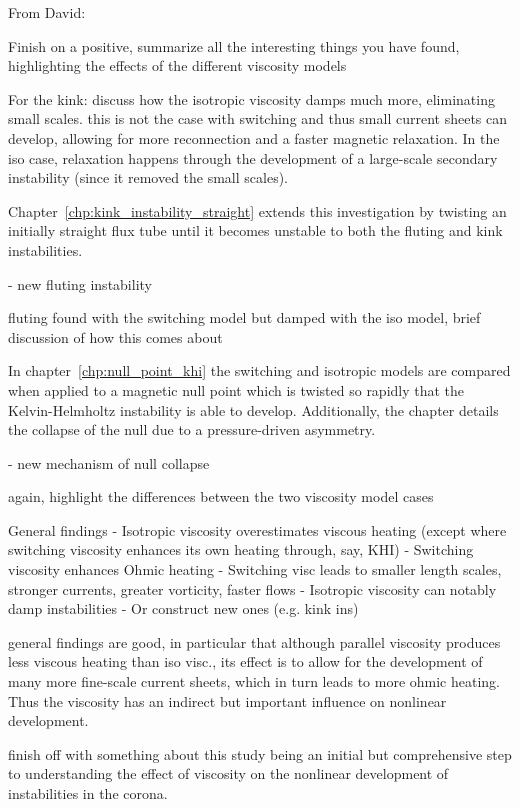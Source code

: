 From David:

Finish on a positive, summarize all the interesting things you have found, highlighting the effects of the different viscosity models

For the kink: discuss how the isotropic viscosity damps much more, eliminating small scales. this is not the case with switching and thus small current sheets can develop, allowing for more reconnection and a faster magnetic relaxation. In the iso case, relaxation happens through the development of a large-scale secondary instability (since it removed the small scales).

Chapter~\ref{chp:kink_instability_straight} extends this investigation by twisting an initially straight flux tube until it becomes unstable to both the fluting and kink instabilities.

- new fluting instability

fluting found with the switching model but damped with the iso model, brief discussion of how this comes about

In chapter~\ref{chp:null_point_khi} the switching and isotropic models are compared when applied to a magnetic null point which is twisted so rapidly that the Kelvin-Helmholtz instability is able to develop. Additionally, the chapter details the collapse of the null due to a pressure-driven asymmetry.

- new mechanism of null collapse

again, highlight the differences between the two viscosity model cases

General findings
- Isotropic viscosity overestimates viscous heating (except where switching viscosity enhances its own heating through, say, KHI)
- Switching viscosity enhances Ohmic heating
- Switching visc leads to smaller length scales, stronger currents, greater vorticity, faster flows
- Isotropic viscosity can notably damp instabilities
- Or construct new ones (e.g. kink ins)

general findings are good, in particular that although parallel viscosity produces less viscous heating than iso visc., its effect is to allow for the development of many more fine-scale current sheets, which in turn leads to more ohmic heating. Thus the viscosity has an indirect but important influence on nonlinear development.


finish off with something about this study being an initial but comprehensive step to understanding the effect of viscosity on the nonlinear development of instabilities in the corona.


